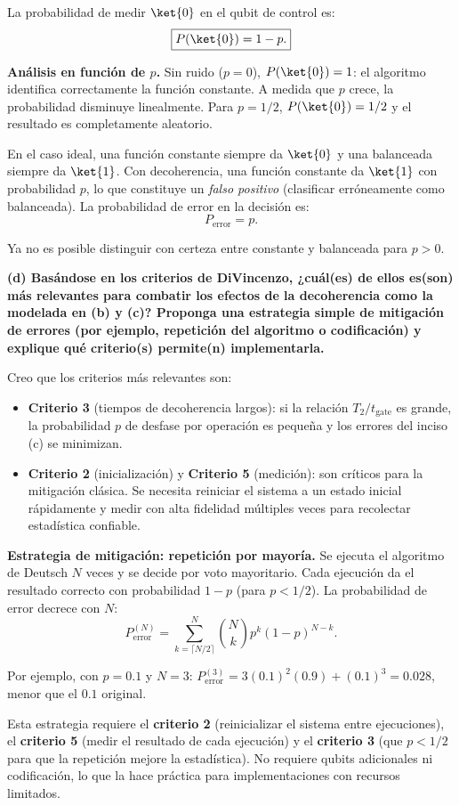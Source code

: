La probabilidad de medir $\ket{0}$ en el qubit de control es:
$$
    \boxed{P(\ket{0}) = 1 - p.}
$$

\textbf{Análisis en función de $p$.} Sin ruido ($p=0$), $P(\ket{0})=1$: el algoritmo identifica correctamente la función constante. A medida que $p$ crece, la probabilidad disminuye linealmente. Para $p=1/2$, $P(\ket{0})=1/2$ y el resultado es completamente aleatorio.

En el caso ideal, una función constante siempre da $\ket{0}$ y una balanceada siempre da $\ket{1}$. Con decoherencia, una función constante da $\ket{1}$ con probabilidad $p$, lo que constituye un \emph{falso positivo} (clasificar erróneamente como balanceada). La probabilidad de error en la decisión es:
$$
    \boxed{P_{\text{error}} = p.}
$$

Ya no es posible distinguir con certeza entre constante y balanceada para $p > 0$.

\vspace{0.5cm}

{\bfseries (d) Basándose en los criterios de DiVincenzo, ¿cuál(es) de ellos es(son) más relevantes para combatir los efectos de la decoherencia como la modelada en (b) y (c)? Proponga una estrategia simple de mitigación de errores (por ejemplo, repetición del algoritmo o codificación) y explique qué criterio(s) permite(n) implementarla.}

Creo que los criterios más relevantes son:

\begin{itemize}
    \item \textbf{Criterio 3} (tiempos de decoherencia largos): si la relación $T_2/t_{\text{gate}}$ es grande, la probabilidad $p$ de desfase por operación es pequeña y los errores del inciso (c) se minimizan.

    \item \textbf{Criterio 2} (inicialización) y \textbf{Criterio 5} (medición): son críticos para la mitigación clásica. Se necesita reiniciar el sistema a un estado inicial rápidamente y medir con alta fidelidad múltiples veces para recolectar estadística confiable.
\end{itemize}

\textbf{Estrategia de mitigación: repetición por mayoría.} Se ejecuta el algoritmo de Deutsch $N$ veces y se decide por voto mayoritario. Cada ejecución da el resultado correcto con probabilidad $1-p$ (para $p < 1/2$). La probabilidad de error decrece con $N$:
$$
    P_{\text{error}}^{(N)} = \sum_{k=\lceil N/2 \rceil}^{N} \binom{N}{k} p^k (1-p)^{N-k}.
$$

Por ejemplo, con $p = 0.1$ y $N = 3$: $P_{\text{error}}^{(3)} = 3(0.1)^2(0.9) + (0.1)^3 = 0.028$, menor que el $0.1$ original.

Esta estrategia requiere el \textbf{criterio 2} (reinicializar el sistema entre ejecuciones), el \textbf{criterio 5} (medir el resultado de cada ejecución) y el \textbf{criterio 3} (que $p < 1/2$ para que la repetición mejore la estadística). No requiere qubits adicionales ni codificación, lo que la hace práctica para implementaciones con recursos limitados.

\vspace{1cm}